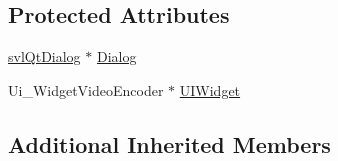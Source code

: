 \subsection*{Protected Attributes}
\begin{DoxyCompactItemize}
\item 
\hyperlink{classsvl_qt_dialog}{svl\-Qt\-Dialog} $\ast$ \hyperlink{classsvl_qt_widget_video_encoder_a0174ccfca03a7e3d6f1bdd1f0d7947be}{Dialog}
\item 
Ui\-\_\-\-Widget\-Video\-Encoder $\ast$ \hyperlink{classsvl_qt_widget_video_encoder_a981a193bb20b562f91838e3270eb99cc}{U\-I\-Widget}
\end{DoxyCompactItemize}
\subsection*{Additional Inherited Members}


